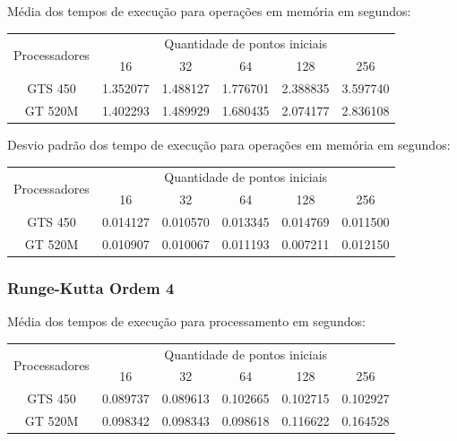    \noindent Média dos tempos de execução para operações em memória em segundos:\\
    \begin{scriptsize}
    \begin{tabular}{| c | c | c | c | c | c |}
      \hline
      \multirow{2}{*}{Processadores}& \multicolumn{5}{|c|}{Quantidade de pontos iniciais} \\ \cline{2-6}
      & 16 & 32 & 64 & 128 & 256 \\ \hline
      GTS 450 & 1.352077 & 1.488127 & 1.776701 & 2.388835 & 3.597740 \\ \hline
      GT 520M & 1.402293 & 1.489929 & 1.680435 & 2.074177 & 2.836108\\ \hline

      \hline
    \end{tabular}
    \end{scriptsize}
    
    \hspace{1mm}\newline
    
    \noindent Desvio padrão dos tempo de execução para operações em memória em segundos:\\
    \begin{scriptsize}
    \begin{tabular}{| c | c | c | c | c | c |}
      \hline
      \multirow{2}{*}{Processadores}& \multicolumn{5}{|c|}{Quantidade de pontos iniciais} \\ \cline{2-6}
      & 16 & 32 & 64 & 128 & 256 \\ \hline
      GTS 450 & 0.014127 & 0.010570 & 0.013345 & 0.014769 & 0.011500 \\ \hline
      GT 520M & 0.010907 & 0.010067 & 0.011193 & 0.007211 & 0.012150 \\ \hline

      \hline
    \end{tabular}
    \end{scriptsize}
    
    \subsubsection{Runge-Kutta Ordem 4} 
    Média dos tempos de execução para processamento em segundos:\\
    \begin{scriptsize}
    \begin{tabular}{| c | c | c | c | c | c |}
      \hline
      \multirow{2}{*}{Processadores}& \multicolumn{5}{|c|}{Quantidade de pontos iniciais} \\ \cline{2-6}
      & 16 & 32 & 64 & 128 & 256 \\ \hline
      GTS 450 & 0.089737 & 0.089613 & 0.102665 & 0.102715 & 0.102927\\ \hline
      GT 520M & 0.098342 & 0.098343 & 0.098618 & 0.116622 & 0.164528\\ \hline

      \hline
    \end{tabular}
    \end{scriptsize}
    
